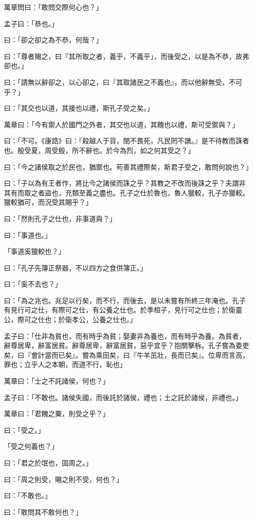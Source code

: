 \begin{pinyinscope}
萬章問曰：「敢問交際何心也？」

孟子曰：「恭也。」

曰：「卻之卻之為不恭，何哉？」

曰：「尊者賜之，曰『其所取之者，義乎，不義乎」，而後受之，以是為不恭，故弗卻也。」

曰：「請無以辭卻之，以心卻之，曰『其取諸民之不義也』，而以他辭無受，不可乎？」

曰：「其交也以道，其接也以禮，斯孔子受之矣。」

萬章曰：「今有禦人於國門之外者，其交也以道，其餽也以禮，斯可受禦與？」

曰：「不可。《康誥》曰：『殺越人于貨，閔不畏死，凡民罔不譈。』是不待教而誅者也。殷受夏，周受殷，所不辭也。於今為烈，如之何其受之？」

曰：「今之諸侯取之於民也，猶禦也。苟善其禮際矣，斯君子受之，敢問何說也？」

曰：「子以為有王者作，將比今之諸侯而誅之乎？其教之不改而後誅之乎？夫謂非其有而取之者盜也，充類至義之盡也。孔子之仕於魯也，魯人獵較，孔子亦獵較。獵較猶可，而況受其賜乎？」

曰：「然則孔子之仕也，非事道與？」

曰：「事道也。」

「事道奚獵較也？」

曰：「孔子先簿正祭器，不以四方之食供簿正。」

曰：「奚不去也？」

曰：「為之兆也。兆足以行矣，而不行，而後去，是以未嘗有所終三年淹也。孔子有見行可之仕，有際可之仕，有公養之仕也。於季桓子，見行可之仕也；於衛靈公，際可之仕也；於衛孝公，公養之仕也。」

孟子曰：「仕非為貧也，而有時乎為貧；娶妻非為養也，而有時乎為養。為貧者，辭尊居卑，辭富居貧。辭尊居卑，辭富居貧，惡乎宜乎？抱關擊柝。孔子嘗為委吏矣，曰『會計當而已矣』。嘗為乘田矣，曰『牛羊茁壯，長而已矣』。位卑而言高，罪也；立乎人之本朝，而道不行，恥也」

萬章曰：「士之不託諸侯，何也？」

孟子曰：「不敢也。諸侯失國，而後託於諸侯，禮也；士之託於諸侯，非禮也。」

萬章曰：「君餽之粟，則受之乎？」

曰：「受之。」

「受之何義也？」

曰：「君之於氓也，固周之。」

曰：「周之則受，賜之則不受，何也？」

曰：「不敢也。」

曰：「敢問其不敢何也？」


\end{pinyinscope}
